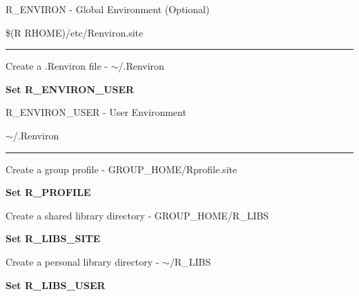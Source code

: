 \documentclass{beamer}
\begin{document}
\begin{frame}{R\_ENVIRON - Global Environment (Optional)}

\begin{center}\$(R RHOME)/etc/Renviron.site\\ \end{center}
\begin{center}
\rule{4cm}{0.6pt}
\end{center}

\bigskip

\begin{center}Create a .Renviron file - $\sim$/.Renviron\\\end{center}
\textbf{Set R\_ENVIRON\_USER} \\

\end{frame}

\begin{frame}{R\_ENVIRON\_USER - User Environment}

\begin{center} $\sim$/.Renviron\\ \end{center}
\begin{center}
\rule{4cm}{0.6pt}
\end{center}

\begin{center}Create a group profile - GROUP\_HOME/Rprofile.site\\ \end{center}

\textbf{Set R\_PROFILE}

\begin{center}Create a shared library directory - GROUP\_HOME/R\_LIBS\\\end{center}

\textbf{Set R\_LIBS\_SITE}

\begin{center}Create a personal library directory - $\sim$/R\_LIBS\\\end{center}

\textbf{Set R\_LIBS\_USER}
\end{frame}
\end{document}
